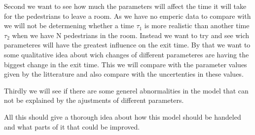 Second we want to see how much the parameters will affect the time it will take for the pedestrians to leave a room. As we have no emperic data to compare with we will not be determening whether a time $\tau_1$ is more realistic than another time $\tau_2$ when we have N pedestrians in the room. Instead we want to try and see wich parameteres will have the greatest influence on the exit time. By that we want to some qualitative idea about wich changes of different parameteres are having the biggest change in the exit time. This we will compare with the parameter values given by the litterature and also compare with the uncertenties in these values.

Thirdly we will see if there are some generel abnormalities in the model that can not be explained by the ajustments of different parameters.

All this should give a thorough idea about how this model should be handeled and what parts of it that could be improved.